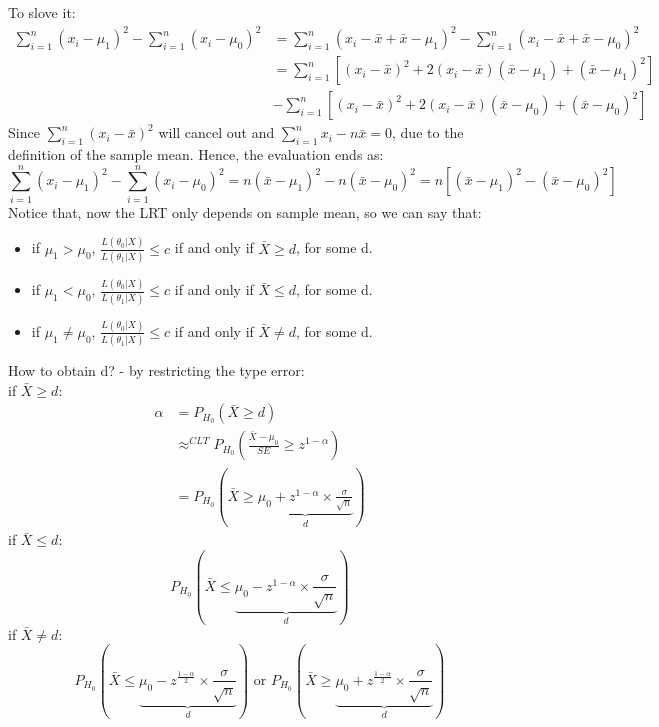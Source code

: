\documentclass[12pt ]{article}
\newcommand{\RomanNumeralCaps}[1] {\MakeUppercase{\romannumeral #1}}
\begin{document}
To slove it:
\begin{align*}
\sum^{n}_{i=1} (x_{i}-\mu_{1})^2 - \sum^{n}_{i=1} (x_{i}-\mu_{0})^2 &= \sum^{n}_{i=1} (x_{i}-\bar{x}+\bar{x}-\mu_{1})^2 - \sum^{n}_{i=1} (x_{i}-\bar{x}+\bar{x}-\mu_{0})^2 \\
&= \sum^{n}_{i=1} [(x_{i}-\bar{x})^2 +2(x_{i}-\bar{x})(\bar{x}-\mu_{1}) + (\bar{x}-\mu_{1})^2] \\
&- \sum^{n}_{i=1} [(x_{i}-\bar{x})^2 + 2(x_{i}-\bar{x})(\bar{x}-\mu_{0})+(\bar{x}-\mu_{0})^2] 
\end{align*}
Since $\sum^{n}_{i=1} (x_{i}-\bar{x})^2$ will cancel out and $\sum^{n}_{i=1} x_{i}-n\bar{x} = 0$, due to the definition of the sample mean. Hence, the evaluation ends as:
\begin{equation*}
\sum^{n}_{i=1} (x_{i}-\mu_{1})^2 - \sum^{n}_{i=1} (x_{i}-\mu_{0})^2 = n (\bar{x}-\mu_{1})^2 - n(\bar{x}-\mu_{0})^2 = n[(\bar{x}-\mu_{1})^2 - (\bar{x}-\mu_{0})^2]
\end{equation*}
Notice that, now the LRT only depends on sample mean, so we can say that:
\begin{itemize}
\item if  $\mu_{1} > \mu_{0}$, $\frac{L(\theta_{0} | X)}{L(\theta_{1} | X)} \leq c$ if and only if $\bar{X} \geq d$, for some d.
\item if  $\mu_{1} < \mu_{0}$, $\frac{L(\theta_{0} | X)}{L(\theta_{1} | X)} \leq c$ if and only if $\bar{X} \leq d$, for some d.
\item if $\mu_{1} \neq \mu_{0}$, $\frac{L(\theta_{0} | X)}{L(\theta_{1} | X)} \leq c$ if and only if $\bar{X} \neq d$, for some d.
\end{itemize}
How to obtain d? - by restricting the type \RomanNumeralCaps{1} error: \\
if $\bar{X} \geq d$:
\begin{align*}
\alpha &= P_{H_{0}} (\bar{X} \geq d)  \\
&\approx^{CLT} P_{H_{0}} (\frac{\bar{X} - \mu_{0}}{SE} \geq z^{1-\alpha}) \\
&= P_{H_{0}} (\bar{X} \geq  \underbrace{\mu_{0} + z^{1-\alpha} \times \frac{\sigma}{\sqrt{n}}}_{d})
\end{align*}
if $\bar{X} \leq d$:
\begin{equation*}
P_{H_{0}} (\bar{X} \leq  \underbrace{\mu_{0} - z^{1-\alpha} \times \frac{\sigma}{\sqrt{n}}}_{d})
\end{equation*}
if $\bar{X} \neq d$:
\begin{equation*}
P_{H_{0}} (\bar{X} \leq  \underbrace{\mu_{0} - z^{\frac{1-\alpha}{2}} \times \frac{\sigma}{\sqrt{n}}}_{d}) \text{   or   } P_{H_{0}} (\bar{X} \geq  \underbrace{\mu_{0} + z^{\frac{1-\alpha}{2}} \times \frac{\sigma}{\sqrt{n}}}_{d})
\end{equation*}
\end{document}
